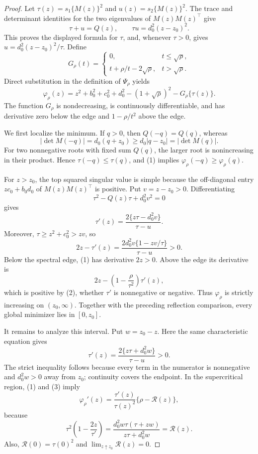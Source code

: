 \documentclass{article}
\begin{document}
\begin{proof}
Let \(\tau(z)=s_1\{M(z)\}^2\) and \(u(z)=s_2\{M(z)\}^2\).  The trace and determinant identities for the two eigenvalues of \(M(z)M(z)^{\top}\) give
\[
 \tau+u=Q(z),\qquad \tau u=d_0^2(z-z_0)^2.
\]
This proves the displayed formula for \(\tau\), and, whenever \(\tau>0\), gives \(u=d_0^2(z-z_0)^2/\tau\).  Define
\[
 G_\rho(t)=
 \begin{cases}
 0,&t\leq\sqrt\rho,\\
 t+\rho/t-2\sqrt\rho,&t>\sqrt\rho.
 \end{cases}
\]
Direct substitution in the definition of \(\Psi_\rho\) yields
\[
 \varphi_\rho(z)=z^2+b_0^2+c_0^2+d_0^2-(1+\sqrt\rho)^2-G_\rho\{\tau(z)\}. \tag{1}
\]
The function \(G_\rho\) is nondecreasing, is continuously differentiable, and has derivative zero below the edge and \(1-\rho/t^2\) above the edge.

We first localize the minimum.  If \(q>0\), then \(Q(-q)=Q(q)\), whereas
\[
 |\det M(-q)|=d_0(q+z_0)\geq d_0|q-z_0|=|\det M(q)|.
\]
For two nonnegative roots with fixed sum \(Q(q)\), the larger root is nonincreasing in their product.  Hence \(\tau(-q)\leq\tau(q)\), and (1) implies \(\varphi_\rho(-q)\geq\varphi_\rho(q)\).

For \(z>z_0\), the top squared singular value is simple because the off-diagonal entry \(zc_0+b_0d_0\) of \(M(z)M(z)^{\top}\) is positive.  Put \(v=z-z_0>0\).  Differentiating
\[
 \tau^2-Q(z)\tau+d_0^2v^2=0
\]
gives
\[
 \tau'(z)=\frac{2\{z\tau-d_0^2v\}}{\tau-u}.
\]
Moreover, \(\tau\geq z^2+c_0^2>zv\), so
\[
 2z-\tau'(z)=\frac{2d_0^2v\{1-zv/\tau\}}{\tau-u}>0. \tag{2}
\]
Below the spectral edge, (1) has derivative \(2z>0\).  Above the edge its derivative is
\[
 2z-\left(1-\frac{\rho}{\tau^2}\right)\tau'(z),
\]
which is positive by (2), whether \(\tau'\) is nonnegative or negative.  Thus \(\varphi_\rho\) is strictly increasing on \((z_0,\infty)\).  Together with the preceding reflection comparison, every global minimizer lies in \([0,z_0]\).

It remains to analyze this interval.  Put \(w=z_0-z\).  Here the same characteristic equation gives
\[
 \tau'(z)=\frac{2\{z\tau+d_0^2w\}}{\tau-u}>0. \tag{3}
\]
The strict inequality follows because every term in the numerator is nonnegative and \(d_0^2w>0\) away from \(z_0\); continuity covers the endpoint.  In the supercritical region, (1) and (3) imply
\[
 \varphi_\rho'(z)
 =\frac{\tau'(z)}{\tau(z)^2}\{\rho-\mathcal R(z)\}, \tag{4}
\]
because
\[
 \tau^2\left(1-\frac{2z}{\tau'}\right)
 =\frac{d_0^2w\tau(\tau+zw)}{z\tau+d_0^2w}
 =\mathcal R(z). \tag{5}
\]
Also, \(\mathcal R(0)=\tau(0)^2\) and \(\lim_{z\uparrow z_0}\mathcal R(z)=0\).


\end{proof}
\end{document}

